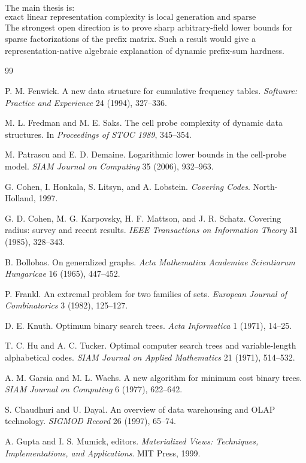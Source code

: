 \documentclass[11pt]{article}
\begin{document}
The main thesis is:
\[
\text{exact linear representation complexity is local generation and sparse factorization.}
\]
The strongest open direction is to prove sharp arbitrary-field lower bounds for sparse factorizations of the prefix matrix. Such a result would give a representation-native algebraic explanation of dynamic prefix-sum hardness.

\begin{thebibliography}{99}

P. M. Fenwick.
A new data structure for cumulative frequency tables.
\emph{Software: Practice and Experience} 24 (1994), 327--336.

M. L. Fredman and M. E. Saks.
The cell probe complexity of dynamic data structures.
In \emph{Proceedings of STOC 1989}, 345--354.

M. Patrascu and E. D. Demaine.
Logarithmic lower bounds in the cell-probe model.
\emph{SIAM Journal on Computing} 35 (2006), 932--963.

G. Cohen, I. Honkala, S. Litsyn, and A. Lobstein.
\emph{Covering Codes}.
North-Holland, 1997.

G. D. Cohen, M. G. Karpovsky, H. F. Mattson, and J. R. Schatz.
Covering radius: survey and recent results.
\emph{IEEE Transactions on Information Theory} 31 (1985), 328--343.

B. Bollobas.
On generalized graphs.
\emph{Acta Mathematica Academiae Scientiarum Hungaricae} 16 (1965), 447--452.

P. Frankl.
An extremal problem for two families of sets.
\emph{European Journal of Combinatorics} 3 (1982), 125--127.

D. E. Knuth.
Optimum binary search trees.
\emph{Acta Informatica} 1 (1971), 14--25.

T. C. Hu and A. C. Tucker.
Optimal computer search trees and variable-length alphabetical codes.
\emph{SIAM Journal on Applied Mathematics} 21 (1971), 514--532.

A. M. Garsia and M. L. Wachs.
A new algorithm for minimum cost binary trees.
\emph{SIAM Journal on Computing} 6 (1977), 622--642.

S. Chaudhuri and U. Dayal.
An overview of data warehousing and OLAP technology.
\emph{SIGMOD Record} 26 (1997), 65--74.

A. Gupta and I. S. Mumick, editors.
\emph{Materialized Views: Techniques, Implementations, and Applications}.
MIT Press, 1999.

\end{thebibliography}
\end{document}
